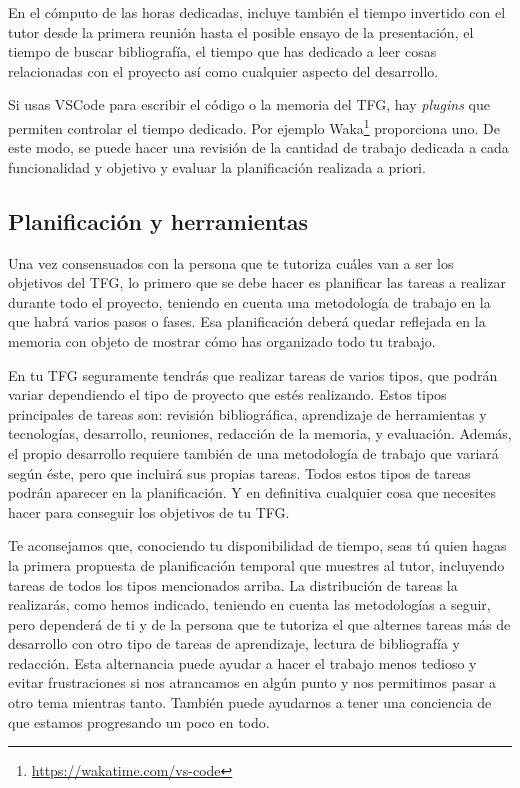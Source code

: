 En el cómputo de las horas dedicadas, incluye también el tiempo invertido con el tutor desde la primera reunión hasta el posible ensayo de la presentación, el tiempo de buscar bibliografía, el tiempo que has dedicado a leer cosas relacionadas con el proyecto así como cualquier aspecto del desarrollo.

Si usas VSCode para escribir el código o la memoria del TFG, hay {\it plugins} que permiten controlar el tiempo dedicado. Por ejemplo {Waka}\footnote{\url{https://wakatime.com/vs-code}} proporciona uno. De este modo, se puede hacer una revisión de la cantidad de trabajo dedicada a cada funcionalidad y objetivo y evaluar la planificación realizada a priori.

\subsection{Planificación y herramientas} %
Una vez consensuados con la persona que te tutoriza cuáles van a ser los objetivos del TFG, lo primero que se debe hacer es planificar las tareas a realizar durante todo el proyecto, teniendo en cuenta una metodología de trabajo en la que habrá varios pasos o fases. Esa planificación deberá quedar reflejada en la memoria con objeto de mostrar cómo has organizado todo tu trabajo.

En tu TFG seguramente tendrás que realizar tareas de varios tipos, que podrán variar dependiendo el tipo de proyecto que estés realizando. Estos tipos principales de tareas son: revisión bibliográfica, aprendizaje de herramientas y tecnologías, desarrollo, reuniones, redacción de la memoria, y evaluación. Además, el propio desarrollo requiere también de una metodología de trabajo que variará según éste, pero que incluirá sus propias tareas. Todos estos tipos de tareas podrán aparecer en la planificación. Y en definitiva cualquier cosa que necesites hacer para conseguir los objetivos de tu TFG.

Te aconsejamos que, conociendo tu disponibilidad de tiempo, seas tú quien hagas la primera propuesta de planificación temporal que muestres al tutor, incluyendo tareas de todos los tipos mencionados arriba. La distribución de tareas la realizarás, como hemos indicado, teniendo en cuenta las metodologías a seguir, pero dependerá de ti y de la persona que te tutoriza el que alternes tareas más de desarrollo con otro tipo de tareas de aprendizaje, lectura de bibliografía y redacción. Esta alternancia puede ayudar a hacer el trabajo menos tedioso y evitar frustraciones si nos atrancamos en algún punto y nos permitimos pasar a otro tema mientras tanto. También puede ayudarnos a tener una conciencia de que estamos progresando un poco en todo. 

